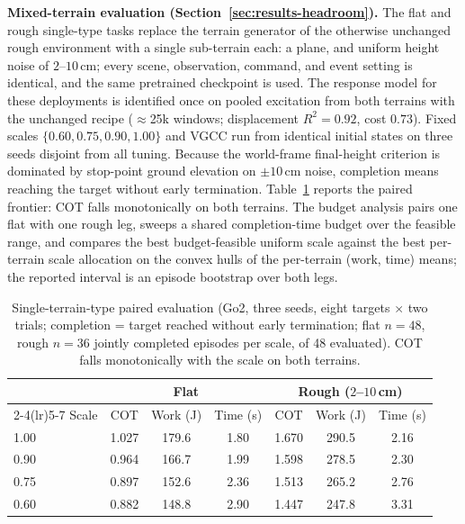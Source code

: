 \textbf{Mixed-terrain evaluation (Section~\ref{sec:results-headroom}).}
\label{app:hetero}
The flat and rough single-type tasks replace the terrain generator of the
otherwise unchanged rough environment with a single sub-terrain each: a plane,
and uniform height noise of $2$--$10$\,cm; every scene, observation, command,
and event setting is identical, and the same pretrained checkpoint is used.
The response model for these deployments is identified once on pooled excitation
from both terrains with the unchanged recipe ($\approx$25k windows; displacement
$R^2=0.92$, cost $0.73$). Fixed scales $\{0.60, 0.75, 0.90, 1.00\}$ and VGCC run
from identical initial states on three seeds disjoint from all tuning. Because
the world-frame final-height criterion is dominated by stop-point ground elevation
on $\pm10$\,cm noise, completion means reaching the target without early
termination. Table~\ref{tab:hetero} reports the paired frontier: COT falls
monotonically on both terrains. The budget analysis pairs one flat with one rough
leg, sweeps a shared completion-time budget over the feasible range, and compares
the best budget-feasible uniform scale against the best per-terrain scale
allocation on the convex hulls of the per-terrain (work, time) means; the
reported interval is an episode bootstrap over both legs.

\begin{table}[h]
\centering
\caption{Single-terrain-type paired evaluation (Go2, three seeds, eight targets $\times$ two trials; completion = target reached without early termination; flat $n=48$, rough $n=36$ jointly completed episodes per scale, of 48 evaluated). COT falls monotonically with the scale on both terrains.}
\label{tab:hetero}
\begin{tabular}{lcccccc}
\toprule
& \multicolumn{3}{c}{Flat} & \multicolumn{3}{c}{Rough ($2$--$10$\,cm)} \\
\cmidrule(lr){2-4}\cmidrule(lr){5-7}
Scale & COT & Work (J) & Time (s) & COT & Work (J) & Time (s) \\
\midrule
1.00 & 1.027 & 179.6 & 1.80 & 1.670 & 290.5 & 2.16 \\
0.90 & 0.964 & 166.7 & 1.99 & 1.598 & 278.5 & 2.30 \\
0.75 & 0.897 & 152.6 & 2.36 & 1.513 & 265.2 & 2.76 \\
0.60 & 0.882 & 148.8 & 2.90 & 1.447 & 247.8 & 3.31 \\
\bottomrule
\end{tabular}
\end{table}

